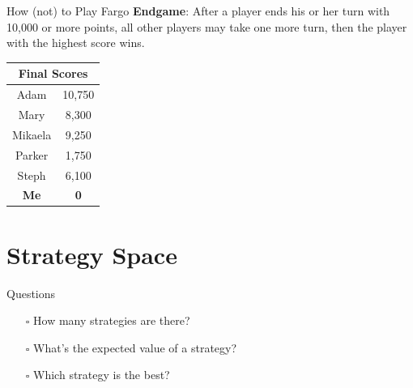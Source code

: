 \documentclass{beamer}
\begin{document}
  \begin{frame}{How (not) to Play Fargo}
  \textbf{Endgame}: 
  After a player ends his or her turn with 10,000 or more points, all other players may take one more turn, then the player with the highest score wins.
  
  \begin{table}
  \centering
  \begin{tabular}{|c|c|}
  \hline
  \multicolumn{2}{|c|}{\textbf{Final Scores}} \\ \hline
Adam                  & 10,750              \\ \hline
Mary                  &  8,300              \\ \hline
Mikaela               &  9,250              \\ \hline
Parker                &  1,750              \\ \hline
Steph                 &  6,100              \\ \hline
\textbf{Me}           & \textbf{0}          \\ \hline
  \end{tabular}
  \end{table}
  \end{frame}









\section{Strategy Space}
  \begin{frame}{Questions}
  \begin{itemize}
  	\item[$\square$] How many strategies are there?
    \item[$\square$] What's the expected value of a strategy?
    \item[$\square$] Which strategy is the best?
  \end{itemize}
  \end{frame}
\end{document}
